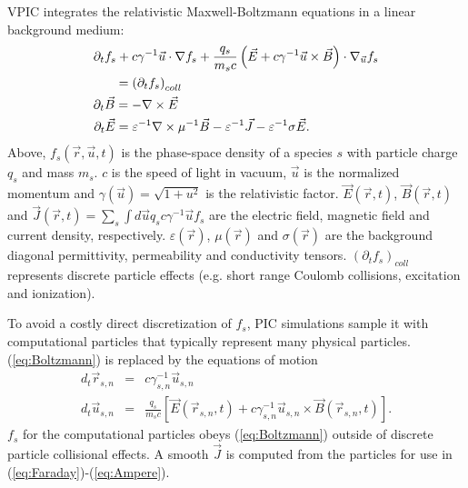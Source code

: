 \documentclass[journal,twoside]{IEEEtran}
\newcommand{\eps}{\varepsilon}
\newcommand{\vecr}{\vec{r}}
\newcommand{\vecu}{\vec{u}}
\newcommand{\vecJ}{\vec{J}}
\newcommand{\vecE}{\vec{E}}
\newcommand{\vecB}{\vec{B}}
\newcommand{\Deriv}[2]{d_{#2}#1}
\newcommand{\PDeriv}[2]{\partial_{#2}#1}
\newcommand{\DotP}[2]{#1 \cdot #2}
\newcommand{\CrossP}[2]{#1 \times #2}
\newcommand{\Grad}[1]{\nabla #1}
\newcommand{\Curl}[1]{\nabla \times #1}
\newcommand{\Gradu}[1]{\nabla_{\vecu} #1}
\newcommand{\eq}[1]{(\ref{eq:#1})}
\begin{document}
VPIC integrates the relativistic Maxwell-Boltzmann equations in a
linear background medium:
\begin{eqnarray}
\PDeriv{f_s}{t} + 
\DotP{c\gamma^{-1}\vecu}{\Grad{f_s}} +
\DotP{\frac{q_s}{m_s c}\left(\vecE+\CrossP{c\gamma^{-1}\vecu}{\vecB}\right)}
{\Gradu{f_s}}\nonumber&\\
= \left(\PDeriv{f_s}{t}\right)_{coll}\label{eq:Boltzmann}
\hspace{2.14in}&\\
\PDeriv{\vecB}{t} = -\Curl{\vecE} \label{eq:Faraday}
\hspace{2.18in}&\\
\PDeriv{\vecE}{t} =
\eps^{-1}\Curl{\mu^{-1}\vecB} - \eps^{-1}\vecJ - \eps^{-1}\sigma\vecE.
\label{eq:Ampere}
\hspace{0.75in}&
\end{eqnarray}
Above, $f_s\left(\vecr,\vecu,t\right)$ is the phase-space density of a
species $s$ with particle charge $q_s$ and mass $m_s$.  $c$ is the
speed of light in vacuum, $\vecu$ is the normalized momentum and
$\gamma\left(\vecu\right) = \sqrt{1 + u^2}$ is the relativistic
factor.  $\vecE\left(\vecr,t\right)$, $\vecB\left(\vecr,t\right)$ and
$\vecJ\left(\vecr,t\right) = \sum_s \int d\vecu q_s c\gamma^{-1}\vecu
f_s$ are the electric field, magnetic field and current density, respectively.
$\eps\left(\vecr\right)$, $\mu\left(\vecr\right)$ and
$\sigma\left(\vecr\right)$ are the background diagonal permittivity,
permeability and conductivity tensors.
$\left(\PDeriv{f_s}{t}\right)_{coll}$ represents discrete particle
effects (e.g. short range Coulomb collisions, excitation and
ionization).

To avoid a costly direct discretization of $f_s$, PIC simulations
sample it with computational particles that typically represent many
physical particles.  \eq{Boltzmann} is replaced by the equations of
motion
\begin{eqnarray}
\Deriv{\vecr_{s,n}}{t} &=& c \gamma_{s,n}^{-1} \vecu_{s,n} \label{eq:Position}\\
\Deriv{\vecu_{s,n}}{t} &=& \frac{q_s}{m_s c} \left[
\vecE\left(\vecr_{s,n},t\right) +
\CrossP{c\gamma_{s,n}^{-1}\vecu_{s,n}}{\vecB\left(\vecr_{s,n},t\right)}
\right] \label{eq:Momentum}
.
\end{eqnarray}
$f_s$ for the computational particles obeys \eq{Boltzmann} outside of
discrete particle collisional effects. A smooth $\vecJ$ is computed
from the particles for use in \eq{Faraday}-\eq{Ampere}.
\end{document}
